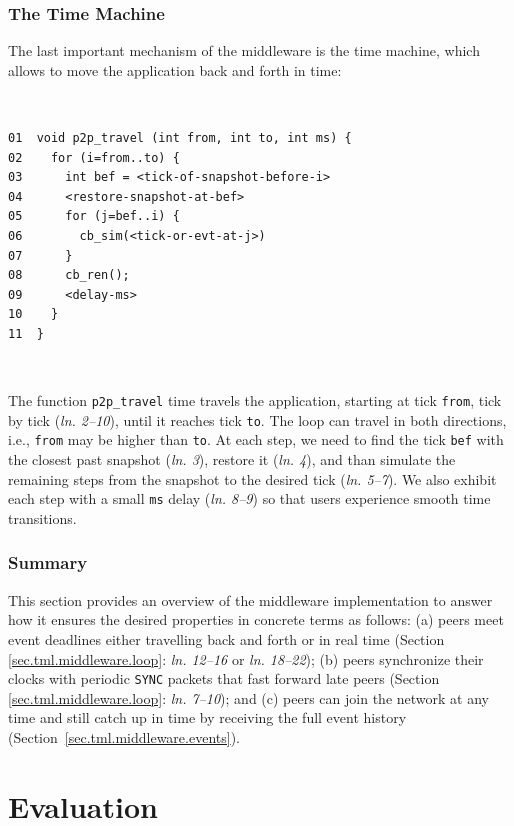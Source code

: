 \documentclass[sn-mathphys,iicol]{sn-jnl}%
\newcommand{\code}[1]  {\texttt{\small{#1}}}
\newcommand{\lin}[1]{(\emph{ln. #1}\xspace)}
\newcommand{\linx}[1]{\emph{ln. #1}\xspace}
\begin{document}
\subsubsection{The Time Machine}
\label{sec.tml.middleware.travel}

The last important mechanism of the middleware is the time machine, which
allows to move the application back and forth in time:

{\footnotesize
~
\begin{verbatim}
01  void p2p_travel (int from, int to, int ms) {
02    for (i=from..to) {
03      int bef = <tick-of-snapshot-before-i>
04      <restore-snapshot-at-bef>
05      for (j=bef..i) {
06        cb_sim(<tick-or-evt-at-j>)
07      }
08      cb_ren();
09      <delay-ms>
10    }
11  }
\end{verbatim}
~
}

The function \code{p2p\_travel} time travels the application, starting at tick
\code{from}, tick by tick \lin{2--10}, until it reaches tick \code{to}.
The loop can travel in both directions, i.e., \code{from} may be higher than
\code{to}.
At each step, we need to find the tick \code{bef} with the closest past
snapshot \lin{3}, restore it \lin{4}, and than simulate the remaining steps
from the snapshot to the desired tick \lin{5--7}.
We also exhibit each step with a small \code{ms} delay \lin{8--9} so that users
experience smooth time transitions.

\subsubsection{Summary}
\label{sec.tml.middleware.summary}

This section provides an overview of the middleware implementation to answer
how it ensures the desired properties in concrete terms as follows:
    (a) peers meet event deadlines either travelling back and forth or in real
        time (Section \ref{sec.tml.middleware.loop}: \linx{12--16} or
        \linx{18--22});
    (b) peers synchronize their clocks with periodic \code{SYNC} packets that
        fast forward late peers (Section \ref{sec.tml.middleware.loop}:
        \linx{7--10}); and
    (c) peers can join the network at any time and still catch up in time by
        receiving the full event history
        (Section~\ref{sec.tml.middleware.events}).

\section{Evaluation}
\label{sec.eval}
\end{document}

